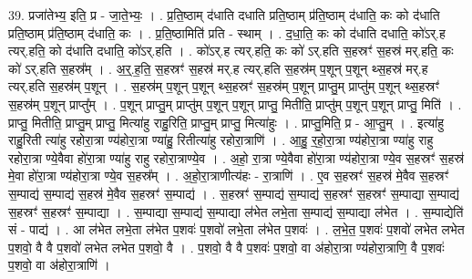 \documentclass[17pt]{extarticle}
\begin{document}
39. प्रजा॑तेभ्य॒ इति॒ प्र - जा॒ते॒भ्यः॒ । . प्र॒ति॒ष्ठाम् द॑धाति दधाति प्रति॒ष्ठाम् प्र॑ति॒ष्ठाम् द॑धाति॒ कः को द॑धाति प्रति॒ष्ठाम् प्र॑ति॒ष्ठाम् द॑धाति॒ कः । . प्र॒ति॒ष्ठामिति॑ प्रति - स्थाम् । . द॒धा॒ति॒ कः को द॑धाति दधाति॒ को॑ऽर्.ह त्यर्.हति॒ को द॑धाति दधाति॒ को॑ऽर्.हति । . को॑ऽर्.ह त्यर्.हति॒ कः को॑ ऽर्.हति स॒हस्रꣳ॑ स॒हस्र॑ मर्.हति॒ कः को॑ ऽर्.हति स॒हस्र᳚म् । . अ॒र्॒.ह॒ति॒ स॒हस्रꣳ॑ स॒हस्र॑ मर्.ह त्यर्.हति स॒हस्र॑म् प॒शून् प॒शून् थ्स॒हस्र॑ मर्.ह त्यर्.हति स॒हस्र॑म् प॒शून् । . स॒हस्र॑म् प॒शून् प॒शून् थ्स॒हस्रꣳ॑ स॒हस्र॑म् प॒शून् प्राप्तु॒म् प्राप्तु॑म् प॒शून् थ्स॒हस्रꣳ॑ स॒हस्र॑म् प॒शून् प्राप्तु᳚म् । . प॒शून् प्राप्तु॒म् प्राप्तु॑म् प॒शून् प॒शून् प्राप्तु॒ मितीति॒ प्राप्तु॑म् प॒शून् प॒शून् प्राप्तु॒ मिति॑ । . प्राप्तु॒ मितीति॒ प्राप्तु॒म् प्राप्तु॒ मित्या॑हु राहु॒रिति॒ प्राप्तु॒म् प्राप्तु॒ मित्या॑हुः । . प्राप्तु॒मिति॒ प्र - आ॒प्तु॒म् । . इत्या॑हु राहु॒रिती त्या॑हु रहोरा॒त्रा ण्य॑होरा॒त्रा ण्या॑हु॒ रितीत्या॑हु रहोरा॒त्राणि॑ । . आ॒हु॒ र॒हो॒रा॒त्रा ण्य॑होरा॒त्रा ण्या॑हु राहु रहोरा॒त्रा ण्ये॒वैवा हो॑रा॒त्रा ण्या॑हु राहु रहोरा॒त्राण्ये॒व । . अ॒हो॒ रा॒त्रा ण्ये॒वैवा हो॑रा॒त्रा ण्य॑होरा॒त्रा ण्ये॒व स॒हस्रꣳ॑ स॒हस्र॑ मे॒वा हो॑रा॒त्रा ण्य॑होरा॒त्रा ण्ये॒व स॒हस्र᳚म् । . अ॒हो॒रा॒त्राणीत्य॑हः - रा॒त्राणि॑ । . ए॒व स॒हस्रꣳ॑ स॒हस्र॑ मे॒वैव स॒हस्रꣳ॑ स॒म्पाद्य॑ स॒म्पाद्य॑ स॒हस्र॑ मे॒वैव स॒हस्रꣳ॑ स॒म्पाद्य॑ । . स॒हस्रꣳ॑ स॒म्पाद्य॑ स॒म्पाद्य॑ स॒हस्रꣳ॑ स॒हस्रꣳ॑ स॒म्पाद्या स॒म्पाद्य॑ स॒हस्रꣳ॑ स॒हस्रꣳ॑ स॒म्पाद्या । . स॒म्पाद्या स॒म्पाद्य॑ स॒म्पाद्या ल॑भेत लभे॒ता स॒म्पाद्य॑ स॒म्पाद्या ल॑भेत । . स॒म्पाद्येति॑ सं - पाद्य॑ । . आ ल॑भेत लभे॒ता ल॑भेत प॒शवः॑ प॒शवो॑ लभे॒ता ल॑भेत प॒शवः॑ । . ल॒भे॒त॒ प॒शवः॑ प॒शवो॑ लभेत लभेत प॒शवो॒ वै वै प॒शवो॑ लभेत लभेत प॒शवो॒ वै । . प॒शवो॒ वै वै प॒शवः॑ प॒शवो॒ वा अ॑होरा॒त्रा ण्य॑होरा॒त्राणि॒ वै प॒शवः॑ प॒शवो॒ वा अ॑होरा॒त्राणि॑ । \newline
\pagebreak
{}
\end{document}

